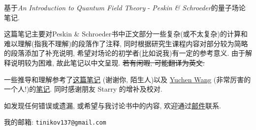 
\begin{spacing}{1.8}
  基于\textit{An Introduction to Quantum Field Theory} - \textit{Peskin \& Schroeder}的量子场论笔记.

  \mbox{}

  这篇笔记主要对Peskin \& Schroeder书中正文部分一些复杂(或不太复杂)的计算和难以理解(指我不理解)的段落作了注释, 同时根据研究生课程内容对部分较为简略的段落添加了补充说明, 希望对场论的初学者(比如说我)有一定的参考意义.
  由于解释说明较为困难, 故此笔记以中文呈现.
  \sout{若有闲暇, 可能翻译为英文.}

  \mbox{}

  一些推导和理解参考了\href{http://gamebm.shoutwiki.com/wiki/Lecture_Notes_of_An_Introduction_to_Quantum_Field_Theory_by_M._Peskin_and_D._Schroeder}{这篇笔记} (谢谢你, 陌生人)以及 \href{https://yuchenw.blog}{Yuchen Wang} (非常厉害的一个人!)的\href{https://yuchenw.blog/qft-notes}{笔记}.
  同时感谢朋友 Starry 的增补及校对.

  \mbox{}

  如发现任何错误或遗漏, 或希望与我讨论书中的内容, 欢迎通过\href{mailto:tinikov137@gmail.com}{邮件}联系.

  我的邮箱: \texttt{tinikov137@gmail.com}
\end{spacing}
\pagestyle{general}
